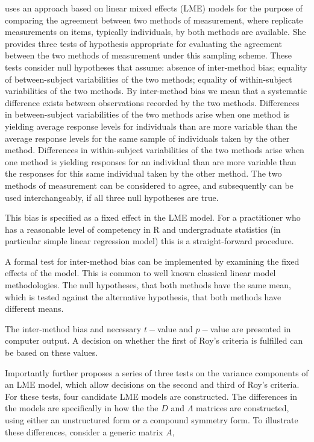 \citet{ARoy2009} uses an approach based on linear mixed effects (LME) models for the purpose of comparing the agreement between two methods of measurement, where replicate measurements on items, typically individuals, by both methods are available. She provides three tests of hypothesis appropriate for evaluating the agreement between the two methods of measurement under this sampling scheme. These tests consider null hypotheses that assume: absence of inter-method bias; equality of between-subject variabilities of the two methods; equality of within-subject variabilities of the two methods. By inter-method bias we mean that a systematic difference exists between observations recorded by the two methods. Differences in between-subject variabilities of the two methods arise when one method is yielding average response levels for individuals than are more variable than the average response levels for the same sample of individuals taken by the other method.  Differences in within-subject variabilities of the two methods arise when one method is yielding responses for an individual than are more variable than the responses for this same individual taken by the other method. The two methods of measurement can be considered to agree, and subsequently can be used interchangeably, if all three null hypotheses are true.


This bias is specified as a fixed effect in the LME model.  For a practitioner who has a reasonable level of competency in R and undergraduate statistics (in particular simple linear regression model) this is a straight-forward procedure.

A formal test for inter-method bias can be implemented by examining the fixed effects of the model. This is common to well known classical linear model methodologies. The null hypotheses, that both methods have the same mean, which is tested against the alternative hypothesis, that both methods have different means.

The inter-method bias and necessary $t-$value and $p-$value are presented in computer output. A decision on whether the first of Roy's criteria is fulfilled can be based on these values.



Importantly \citet{ARoy2009} further proposes a series of three tests on the variance components of an LME model, which allow decisions on the second and third of Roy's criteria. For these tests, four candidate LME models are constructed. The differences in the models are specifically in how the the $D$ and $\Lambda$ matrices are constructed, using either an unstructured form or a compound symmetry form. To illustrate these differences, consider a generic matrix $A$,

